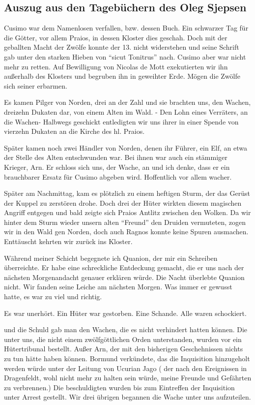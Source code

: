 \subsection{Auszug aus den Tagebüchern des Oleg Sjepsen}

Cusimo war dem Namenlosen verfallen, bzw. dessen Buch. Ein schwarzer Tag für die Götter, vor allem Praios, in dessen Kloster dies geschah. Doch mit der geballten Macht der Zwölfe konnte der 13. nicht widerstehen und seine Schrift gab unter den starken Hieben von ``sicut Tonitrus'' nach. Cusimo aber war nicht mehr zu retten. Auf Bewilligung von Nicolas de Mott exekutierten wir ihn außerhalb des Klosters und begruben ihn in geweihter Erde. Mögen die Zwölfe sich seiner erbarmen.

Es kamen Pilger von Norden, drei an der Zahl und sie brachten uns, den Wachen, dreizehn Dukaten dar, von einem Alten im Wald. - Den Lohn eines Verräters, an die Wachen- Halbwegs geschickt entledigten wir uns ihrer in einer Spende von vierzehn Dukaten an die Kirche des hl. Praios.

Später kamen noch zwei Händler von Norden, denen ihr Führer, ein Elf, an etwa der Stelle des Alten entschwunden war. Bei ihnen war auch ein stämmiger Krieger, Arn. Er schloss sich uns, der Wache, an und ich denke, dass er ein brauchbarer Ersatz für Cusimo abgeben wird. Hoffentlich vor allem wacher.

Später am Nachmittag, kam es plötzlich zu einem heftigen Sturm, der das Gerüst der Kuppel zu zerstören drohe. Doch drei der Hüter wirkten diesem magischen Angriff entgegen und bald zeigte sich Praios Antlitz zwischen den Wolken. Da wir hinter dem Sturm wieder unsern alten ``Freund'' den Druiden vermuteten, zogen wir in den Wald gen Norden, doch auch Ragnos konnte keine Spuren ausmachen. Enttäuscht kehrten wir zurück ins Kloster.

Während meiner Schicht begegnete ich Quanion, der mir ein Schreiben überreichte. Er habe eine schreckliche Entdeckung gemacht, die er uns nach der nächsten Morgenandacht genauer erklären würde. Die Nacht überlebte Quanion nicht. Wir fanden seine Leiche am nächsten Morgen. Was immer er gewusst hatte, es war zu viel und richtig.

Es war unerhört. Ein Hüter war gestorben. Eine Schande. Alle waren schockiert.

und die Schuld gab man den Wachen, die es nicht verhindert hatten können. Die unter uns, die nicht einem zwölfgöttlichen Orden unterstanden, wurden vor ein Hütertribunal bestellt. Außer Arn, der mit den bisherigen Geschehnissen nichts zu tun hätte haben können. Bormund verkündete, das die Inquisition hinzugeholt werden würde unter der Leitung von Ucurian Jago ( der nach den Ereignissen in Dragenfeldt, wohl nicht mehr zu halten sein würde, meine Freunde und Gefährten zu verbrennen.) Die beschuldigten wurden bis zum Eintreffen der Inquisition unter Arrest gestellt. Wir drei übrigen begannen die Wache unter uns aufzuteilen.

